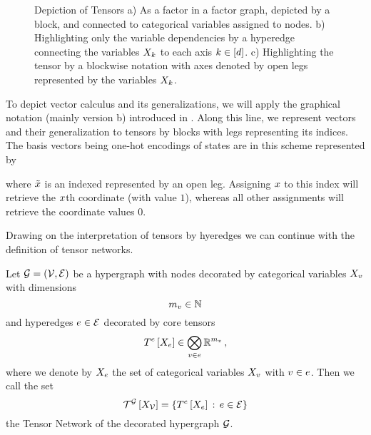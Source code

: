 \begin{figure}[h!]
	\begin{center}
		
	\end{center}
	\caption{Depiction of Tensors
	a) As a factor in a factor graph, depicted by a block, and connected to categorical variables assigned to nodes.
	b) Highlighting only the variable dependencies by a hyperedge connecting the variables $X_{k}$ to each axis $k\in[d]$.
	c) Highlighting the tensor by a blockwise notation with axes denoted by open legs represented by the variables $X_{k}$.
	}\label{fig:tensors}
\end{figure}


To depict vector calculus and its generalizations, we will apply the graphical notation (mainly version b) introduced in .
Along this line, we represent vectors and their generalization to tensors by blocks with legs representing its indices.
The basis vectors being one-hot encodings of states are in this scheme represented by
	\begin{center}
		
	\end{center}
where $\tilde{x}$ is an indexed represented by an open leg.
Assigning $x$ to this index will retrieve the $x$th coordinate (with value $1$), whereas all other assignments will retrieve the coordinate values $0$.


Drawing on the interpretation of tensors by hyeredges we can continue with the definition of tensor networks.

\begin{definition}\label{def:tensorNetwork}
	Let $\mathcal{G}=(\mathcal{V},\mathcal{E})$ be a hypergraph with nodes decorated by categorical variables $X_{v}$ with dimensions
		\[ m_{v} \in \mathbb{N} \]
	and hyperedges $e\in\mathcal{E}$ decorated by core tensors
		\[ T^{e}\left[X_{e}\right] \in \bigotimes_{v\in e}\mathbb{R}^{m_{v}} \, , \]
	where we denote by $X_{e}$ the set of categorical variables $X_{v}$ with $v\in e$.
	Then we call the set
		\[ \mathcal{T}^{\mathcal{G}}\left[X_{\mathcal{V}}\right] = \{T^{e}\left[X_{e}\right]  \, : \, e\in\mathcal{E}\} \]
	the Tensor Network of the decorated hypergraph $\mathcal{G}$.
\end{definition}


